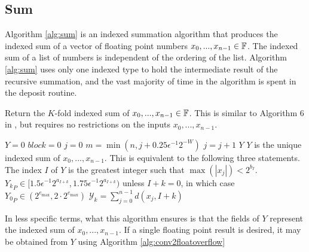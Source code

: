   \subsection{Sum}
    \label{sec:compositeops_sum}
    Algorithm \ref{alg:sum} is an indexed summation algorithm that produces the indexed sum of a vector of floating point numbers $x_0, ..., x_{n - 1} \in \mathbb{F}$.
    The indexed sum of a list of numbers is independent of the ordering of the list.
    Algorithm \ref{alg:sum} uses only one indexed type to hold the intermediate result of the recursive summation, and the vast majority of time in the algorithm is spent in the deposit routine.
    \begin{samepage}
    \begin{alg}
      Return the $K$-fold indexed sum of $x_0, ..., x_{n-1} \in \mathbb{F}$.
      This is similar to Algorithm $6$ in \cite{repsum}, but requires no restrictions on the inputs $x_0, ..., x_{n - 1}$.
      \begin{algorithmic}[1]
          \State $Y = 0$
          \State $block = 0$
          \State $j = 0$ \label{alg:sum:setj}
          \label{alg:sum:outerloop}
            \State $m = \min(n, j + 0.25\epsilon^{-1}2^{-W})$
            \State \Call{Update}{K, $\max([|x_j|, ..., |x_{m - 1}|)$, Y}\label{alg:sum:update}
              \State {}\label{alg:sum:deposit}
              \State $j = j + 1$
            \EndWhile
            \State {}\label{alg:sum:renorm}
          \EndWhile
          \State \Return $Y$
        \EndFunction
        \Ensure
        \Statex $Y$ is the unique indexed sum of $x_0, ..., x_{n - 1}$. This is equivalent to the following three statements.
        \Statex The index $I$ of $Y$ is the greatest integer such that $\max(|x_j|) < 2^{b_I}$.
        \Statex ${Y_k}_P \in [1.5  \epsilon^{-1} 2^{a_{I + k}}, 1.75  \epsilon^{-1} 2^{a_{I + k}})$ unless $I + k = 0$, in which case ${Y_0}_P \in (2^{e_{\max}}, 2 \cdot 2^{e_{\max}})$
        \Statex $\mathcal{Y}_k = \sum\limits_{j = 0}^{n - 1}d(x_j, I + k)$
      \end{algorithmic}
      \label{alg:sum}
    \end{alg}
    \end{samepage}
    In less specific terms, what this algorithm ensures is that the fields of $Y$ represent the indexed sum of $x_0, ..., x_{n - 1}$. If a single floating point result is desired, it may be obtained from $Y$ using Algorithm \ref{alg:conv2floatoverflow}
